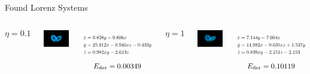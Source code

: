 \documentclass[aspectratio=169]{beamer}
\begin{document}
\begin{frame}{Found Lorenz Systems}
\begin{columns}
		\[ \eta = 0.1 \]
		\begin{center}
			\includegraphics[width=0.95\textwidth, trim={4cm, 3.2cm, 4cm, 3.1cm}, clip]{found_lorenz_01.pdf}
		\end{center}
		\begin{equation*}
		\resizebox{!}{1.4em}{$\begin{aligned}
			\dot x &=   9.838y -9.806x\\
			\dot y &= 25.912x   -0.946xz-0.433y \\
			\dot z &=   0.982xy-2.613z
		\end{aligned} $}
		\end{equation*}
		\[ \text{\small $E_\text{der} = 0.00349$} \]

		\[ \eta = 1 \]
		\begin{center}
			\includegraphics[width=0.95\textwidth, trim={4cm, 3.2cm, 4cm, 3.1cm}, clip]{found_lorenz_1.pdf}
		\end{center}
		\begin{equation*}
		\resizebox{!}{1.4em}{$ \begin{aligned}
			\dot x &=  7.144y-7.004x \\
			\dot y &= 14.982x  -0.635xz+ 1.537y \\
			\dot z &=   0.839xy-2.151z-2.153
		\end{aligned} $}
		\end{equation*}
		\[ \text{\small $E_\text{der} = 0.10119$} \]
	\end{columns}
\end{frame}
\end{document}
